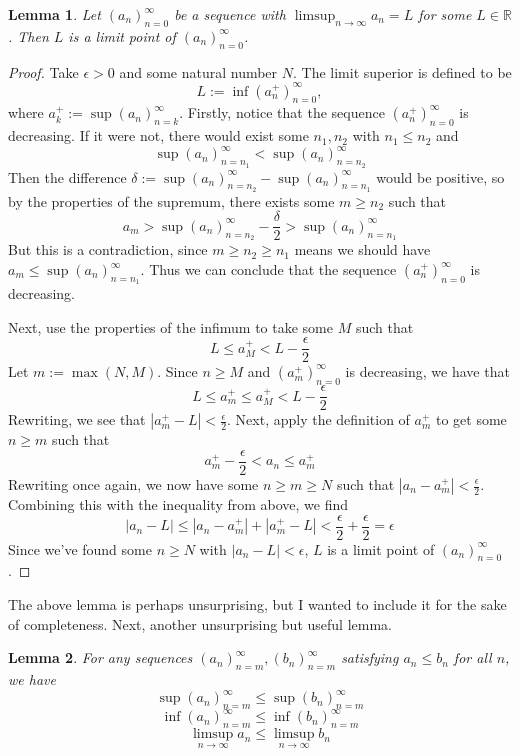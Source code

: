 \documentclass[11pt, oneside]{article}
\newcommand{\R}{\mathbb{R}}
\newtheorem{lemma}{Lemma}
\theoremstyle{definition}
\begin{document}
\begin{lemma}\label{limpts}
    Let $(a_n)_{n=0}^\infty$ be a sequence with $\limsup_{n \rightarrow \infty} a_n = L$ for some $L \in \R$.
    Then $L$ is a limit point of $(a_n)_{n=0}^\infty$.
\end{lemma}

\begin{proof}
    Take $\epsilon > 0$ and some natural number $N$. The limit superior is defined to be
    $$L := \inf (a_n^+)_{n=0}^\infty,$$
    where $a_k^+ := \sup (a_n)_{n=k}^\infty$. Firstly, notice that the sequence $(a_n^+)_{n=0}^\infty$ is decreasing.
    If it were not, there would exist some $n_1, n_2$ with $n_1 \leq n_2$ and
    $$\sup (a_n)_{n=n_1}^\infty < \sup (a_n)_{n=n_2}^\infty$$
    Then the difference $\delta := \sup (a_n)_{n=n_2}^\infty - \sup (a_n)_{n=n_1}^\infty$ would be positive, so by the properties of the supremum, there exists some $m \geq n_2$ such that
    $$a_m > \sup (a_n)_{n=n_2}^\infty - \frac{\delta}{2} > \sup (a_n)_{n=n_1}^\infty$$
    But this is a contradiction, since $m \geq n_2 \geq n_1$ means we should have $a_m \leq \sup (a_n)_{n=n_1}^\infty$.
    Thus we can conclude that the sequence $(a_n^+)_{n=0}^\infty$ is decreasing.
    
    Next, use the properties of the infimum to take some $M$ such that
    $$L \leq a_M^+ < L - \frac{\epsilon}{2}$$
    Let $m := \max(N, M)$. Since $n \geq M$ and $(a_m^+)_{n=0}^\infty$ is decreasing, we have that
    $$L \leq a_m^+ \leq a_M^+ < L - \frac{\epsilon}{2}$$
    Rewriting, we see that $|a_m^+ - L| < \frac{\epsilon}{2}$.
    Next, apply the definition of $a_m^+$ to get some $n \geq m$ such that
    $$a_m^+ - \frac{\epsilon}{2} < a_n \leq a_m^+$$
    Rewriting once again, we now have some $n \geq m \geq N$ such that $|a_n - a_m^+| < \frac{\epsilon}{2}$. Combining this with the inequality from above, we find
    $$|a_n - L| \leq |a_n - a_m^+| + |a_m^+ - L| < \frac{\epsilon}{2} + \frac{\epsilon}{2} = \epsilon$$
    Since we've found some $n \geq N$ with $|a_n - L| < \epsilon$, $L$ is a limit point of $(a_n)_{n=0}^\infty$.
\end{proof}

The above lemma is perhaps unsurprising, but I wanted to include it for the sake of completeness. Next, another unsurprising but useful lemma.
\begin{lemma}\label{comparison}
    For any sequences $(a_n)_{n=m}^\infty, (b_n)_{n=m}^\infty$ satisfying $a_n \leq b_n$ for all $n$, we have
    \begin{equation}
        \sup (a_n)_{n=m}^\infty \leq \sup (b_n)_{n=m}^\infty
    \end{equation}
    \begin{equation}
        \inf (a_n)_{n=m}^\infty \leq \inf (b_n)_{n=m}^\infty
    \end{equation}
    \begin{equation}
        \limsup_{n \rightarrow \infty} a_n \leq \limsup_{n \rightarrow \infty} b_n
    \end{equation}
\end{lemma}
\end{document}
